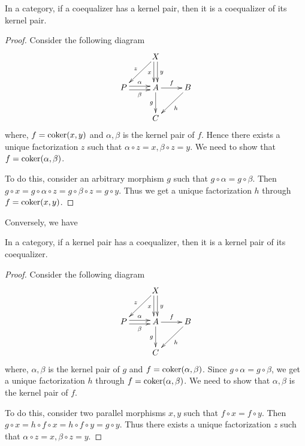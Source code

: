   \begin{prop}\label{prop:effective1}
    In a category, if a coequalizer has a kernel pair, then it is a coequalizer of its kernel pair.
  \end{prop}
  \begin{proof}
    Consider the following diagram
    \begin{displaymath}
      \xymatrix{
         &X\ar@<-0.5ex>[d]_{x}\ar@<0.5ex>[d]^{y}\ar[dl]_{z}&\\
         P\ar@<0.5ex>[r]^{\alpha}\ar@<-0.5ex>[r]_{\beta}&A\ar[r]^{f}\ar[d]_{g}&B\ar[dl]^{h}\\
         &C&
      }
    \end{displaymath}
    where, $f=\operatorname{coker}(x,y)$ and $\alpha,\beta$ is the kernel pair of $f$. Hence there exists a unique factorization $z$ such that $\alpha\circ z=x, \beta\circ z=y$.
    We need to show that $f=\operatorname{coker}(\alpha,\beta)$.

    To do this, consider an arbitrary morphism $g$ such that $g\circ\alpha=g\circ\beta$. Then $g\circ x=g\circ\alpha\circ z=g\circ\beta\circ z=g\circ y$. Thus we get a unique factorization $h$ through $f=\operatorname{coker}(x,y)$.
  \end{proof}
  Conversely, we have
  \begin{prop}\label{prop:effective2}
    In a category, if a kernel pair has a coequalizer, then it is a kernel pair of its coequalizer.
  \end{prop}
  \begin{proof}
    Consider the following diagram
    \begin{displaymath}
      \xymatrix{
         &X\ar@<-0.5ex>[d]_{x}\ar@<0.5ex>[d]^{y}\ar[dl]_{z}&\\
         P\ar@<0.5ex>[r]^{\alpha}\ar@<-0.5ex>[r]_{\beta}&A\ar[r]^{f}\ar[d]_{g}&B\ar[dl]^{h}\\
         &C&
      }
    \end{displaymath}
    where, $\alpha,\beta$ is the kernel pair of $g$ and $f=\operatorname{coker}(\alpha,\beta)$. Since $g\circ\alpha=g\circ\beta$, we get a unique factorization $h$ through $f=\operatorname{coker}(\alpha,\beta)$.
    We need to show that $\alpha,\beta$ is the kernel pair of $f$.

    To do this, consider two parallel morphisms $x,y$ such that $f\circ x=f\circ y$. Then $g\circ x=h\circ f\circ x=h\circ f\circ y=g\circ y$. Thus there exists a unique factorization $z$ such that $\alpha\circ z=x, \beta\circ z=y$.
  \end{proof}

